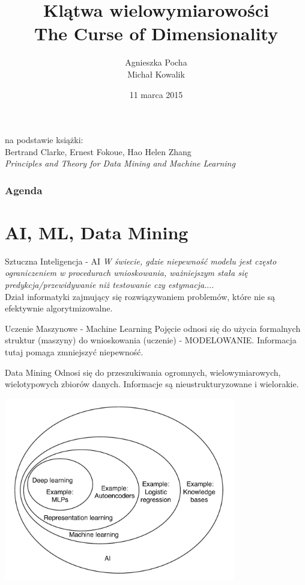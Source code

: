 \documentclass[a4paper]{beamer}
\author{Agnieszka Pocha \\ Michał Kowalik}
\title{Klątwa wielowymiarowości \\ The Curse of Dimensionality}
\date{11 marca 2015}
\begin{document}
\begin{frame}
\titlepage
{\footnotesize
na podstawie książki: \\
Bertrand Clarke, Ernest Fokoue, Hao Helen Zhang \\
}
\textit{Principles and Theory for Data Mining and Machine Learning}
\end{frame}


\begin{frame}
\frametitle{Agenda}
\tableofcontents
\end{frame}

\section{AI, ML, Data Mining}
\begin{frame}
\begin{block}{Sztuczna Inteligencja - AI}
\textit{W świecie, gdzie niepewność modelu jest często ograniczeniem w procedurach wnioskowania, ważniejszym stała się predykcja/przewidywanie niż testowanie czy estymacja.}... \\
Dział informatyki zajmujący się rozwiązywaniem problemów, które nie są efektywnie algorytmizowalne.
\end{block}
\pause
\begin{block}{Uczenie Maszynowe - Machine Learning}
Pojęcie odnosi się do użycia formalnych struktur (maszyny) do wnioskowania (uczenie) - MODELOWANIE. Informacja tutaj pomaga zmniejszyć niepewność.
\end{block}
\pause
\begin{block}{Data Mining}
Odnosi się do przeszukiwania ogromnych, wielowymiarowych, wielotypowych zbiorów danych. Informacje są nieustrukturyzowane i wielorakie.
\end{block}
\end{frame}
\begin{frame}

\begin{center}
\includegraphics[height=8cm]{aiclasification.png}
\end{center}
\end{frame}
\end{document}
